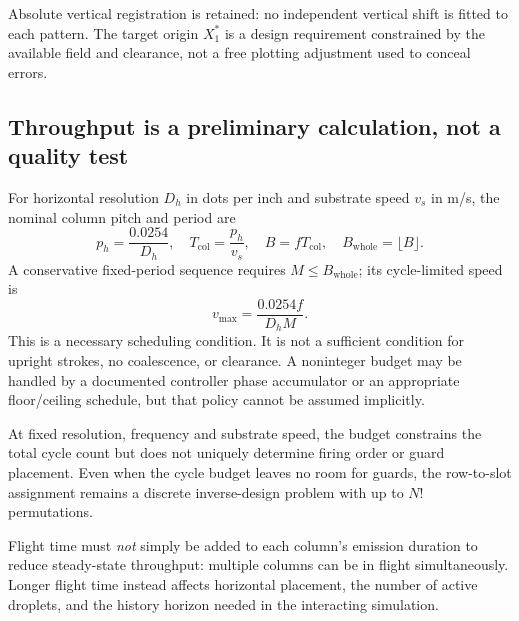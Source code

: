 Absolute vertical registration is retained: no independent vertical shift is fitted to each pattern. The target origin $X_1^*$ is a design requirement constrained by the available field and clearance, not a free plotting adjustment used to conceal errors.

\subsection{Throughput is a preliminary calculation, not a quality test}
For horizontal resolution $D_h$ in dots per inch and substrate speed $v_s$ in m/s, the nominal column pitch and period are
\begin{equation}
 p_h=\frac{0.0254}{D_h},\quad T_{\mathrm{col}}=\frac{p_h}{v_s},\quad
 B=fT_{\mathrm{col}},\quad B_{\mathrm{whole}}=\lfloor B\rfloor.
\label{eq:budget}
\end{equation}
A conservative fixed-period sequence requires $M\leq B_{\mathrm{whole}}$; its cycle-limited speed is
\begin{equation}
 v_{\max}=\frac{0.0254f}{D_h M}.
\label{eq:speed}
\end{equation}
This is a necessary scheduling condition. It is not a sufficient condition for upright strokes, no coalescence, or clearance. A noninteger budget may be handled by a documented controller phase accumulator or an appropriate floor/ceiling schedule, but that policy cannot be assumed implicitly.

At fixed resolution, frequency and substrate speed, the budget constrains the total cycle count but does not uniquely determine firing order or guard placement. Even when the cycle budget leaves no room for guards, the row-to-slot assignment remains a discrete inverse-design problem with up to $N!$ permutations.



Flight time must \emph{not} simply be added to each column's emission duration to reduce steady-state throughput: multiple columns can be in flight simultaneously. Longer flight time instead affects horizontal placement, the number of active droplets, and the history horizon needed in the interacting simulation.


